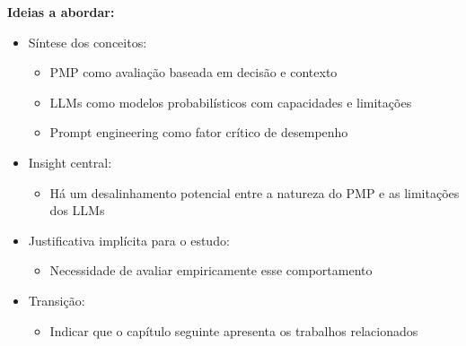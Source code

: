 \textbf{Ideias a abordar:}
\begin{itemize}
    \item Síntese dos conceitos:
    \begin{itemize}
        \item PMP como avaliação baseada em decisão e contexto
        \item LLMs como modelos probabilísticos com capacidades e limitações
        \item Prompt engineering como fator crítico de desempenho
    \end{itemize}
    \item Insight central:
    \begin{itemize}
        \item Há um desalinhamento potencial entre a natureza do PMP e as limitações dos LLMs
    \end{itemize}
    \item Justificativa implícita para o estudo:
    \begin{itemize}
        \item Necessidade de avaliar empiricamente esse comportamento
    \end{itemize}
    \item Transição:
    \begin{itemize}
        \item Indicar que o capítulo seguinte apresenta os trabalhos relacionados
    \end{itemize}
\end{itemize}